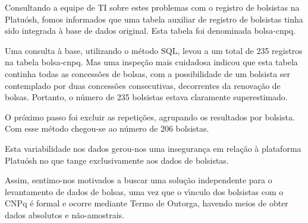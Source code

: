 \documentclass[
12pt,		%
openright,	%
twoside,  %
a4paper,			%
chapter=TITLE,		%
english,			%
french,				%
spanish,			%
brazil				%
]{USPSC-classe/USPSC}
\begin{document}
Consultando a equipe de TI sobre estes problemas com o registro de bolsistas na Platu\'osh, fomos informados que uma tabela auxiliar de registro de bolsistas tinha sido integrada \`a base de dados original. Esta tabela foi denominada \textquotedbl bolsa-cnpq\textquotedbl .














Uma consulta \`a base, utilizando o m\'etodo SQL, levou a um total de 235 registros na tabela \textquotedbl bolsa-cnpq\textquotedbl . Mas uma inspe\c{c}\~ao mais cuidadosa indicou que esta tabela continha todas as concess\~oes de bolsas, com a possibilidade de um bolsista ser contemplado por duas concess\~oes consecutivas, decorrentes da renova\c{c}\~ao de bolsas. Portanto, o n\'umero de 235 bolsistas estava claramente superestimado.














O pr\'oximo passo foi excluir as repeti\c{c}\~oes, agrupando os resultados por bolsista. Com esse m\'etodo chegou-se ao n\'umero de 206 bolsistas.














Esta variabilidade nos dados gerou-nos uma inseguran\c{c}a em rela\c{c}\~ao \`a plataforma Platu\'osh no que tange exclusivamente aos dados de bolsistas.














Assim, sentimo-nos motivados a buscar uma solu\c{c}\~ao independente para o levantamento de dados de bolsas, uma vez que o v\'{\i}nculo dos bolsistas com o CNPq \'e formal e ocorre mediante Termo de Outorga, havendo meios de obter dados absolutos e n\~ao-amostrais.
\end{document}
